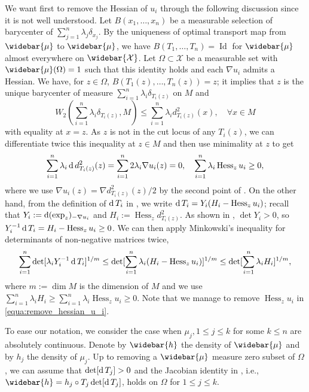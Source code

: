 We want first to remove the Hessian of $u_i$ through
the following discussion since it is not well understood.
Let $B(x_1,\ldots,x_n)$ be a measurable selection of barycenter of $\sum_{j=1}^n \lambda_j \delta_{x_j}$.
By the uniqueness of optimal transport map from $\widebar{\mu}$ to $\widebar{\mu}$,
we have $B(T_1, \ldots, T_n) = \operatorname{Id}$ for $\widebar{\mu}$ almost everywhere on $\widebar{\mathcal{X}}$.
Let $\Omega \subset \mathcal{X} $ be a measurable set with $\widebar{\mu}(\Omega) = 1 $ such that
this identity holds and each $\nabla u_i$ admits a Hessian.
We have, for $z \in \Omega$, $B(T_1(z), \ldots, T_n(z))=z$;
it implies that $z$ is the unique barycenter of
measure $\sum_{i=1}^n \lambda_i \delta_{T_i(z)}$ on $M$ and
\[
	W_2(\sum_{i=1}^n \lambda_i \delta_{T_i(z)}, M) \leq \sum_{i=1}^n \lambda_i d_{T_i(z)}^2(x),\quad \forall x \in M
\] with equality at $x=z$.
As $z$ is not in the cut locus of any $T_i(z)$,
we can differentiate twice this inequality at $z \in M$
and then use minimality at $z$ to get
\[
	\sum_{i=1}^n \lambda_i \operatorname{d} d^2_{T_i(z)} (z) =\sum_{i=1}^n 2 \lambda_i \nabla u_i (z) =0
	,\quad \sum_{i=1}^n \lambda_i \operatorname{Hess}_z u_i \geq 0,
\]
where we use $\nabla u_i(z) = \nabla d^2_{T_i(z)}(z)/2$ by the second point of .
On the other hand, from the definition of $\operatorname{d} T_i$ in ,
we write $\operatorname{d} T_i = Y_i ( H_i - \operatorname{Hess}_z u_i)$;
recall that $Y_i := \operatorname{d} (\exp_z)_{-\nabla u_i}$
and $H_i := \operatorname{Hess}_z d^2_{T_i(z)}$.
As shown in \cite[Lemma 2.1]{cordero2001riemannian}, $\det Y_i >0$,
so $Y_i^{-1} \operatorname{d} T_i = H_i - \operatorname{Hess}_z u_i \geq 0$.
We can then apply Minkowski's
inequality for determinants of non-negative matrices twice,
\begin{equation}
	\label{equa:remove_hessian_u_i}
	\sum_{i=1}^{n} \det[ \lambda_i Y_i^{-1} \operatorname{d} T_i]^{1/m}
	\leq
	\det [\sum_{i=1}^n \lambda_i(H_i - \operatorname{Hess}_z u_i)]^{1/m}
	\leq
	\det [\sum_{i=1}^n \lambda_i H_i]^{1/m},
\end{equation}
where $m := \dim M$ is the dimension of $M$
and we use $\sum_{i=1}^n \lambda_i H_i \geq \sum_{i=1}^n \lambda_i \operatorname{Hess}_z u_i \geq 0$.
Note that we manage to remove $\operatorname{Hess}_z u_i$
in \cref{equa:remove_hessian_u_i}.

To ease our notation, we consider the case when $\mu_j, 1 \leq j \leq k$
for some $k \leq n$ are absolutely continuous.
Denote by $\widebar{h}$ the density of $\widebar{\mu}$ and
by $h_j$ the density of $\mu_j$.
Up to removing a $\widebar{\mu}$ measure zero subset of $\Omega$,
we can assume that $\det [\operatorname{d} T_j] >0$ and
the Jacobian identity in , i.e.,
$\widebar{h} = h_j \circ T_j \det [\diff T_j]$,
holds on $\Omega$ for $ 1\leq j \leq k$.

